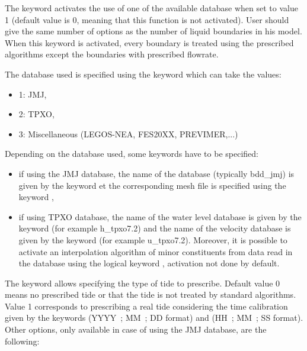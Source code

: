  The keyword  activates the use of one of the available database when set to value 1 (default value is 0, meaning that this function is not activated). User should give the same number of options as the number of liquid boundaries in his model. When this keyword is activated, every boundary is treated using the prescribed algorithms except the boundaries with prescribed flowrate.

 The database used is specified using the keyword which can take the values:

\begin{itemize}
\item [\nonumber] 1: JMJ,

\item [\nonumber] 2: TPXO,

\item [\nonumber] 3: Miscellaneous (LEGOS-NEA, FES20XX, PREVIMER,...)
\end{itemize}

  Depending on the database used, some keywords have to be specified:

\begin{itemize}
\item  if using the JMJ database, the name of the database (typically bdd\_jmj) is given by the keyword  et the corresponding mesh file is specified using the keyword ,

\item  if using TPXO database, the name of the water level database is given by the keyword  (for example h\_tpxo7.2) and the name of the velocity database is given by the keyword  (for example u\_tpxo7.2). Moreover, it is possible to activate an interpolation algorithm of minor constituents from data read in the database using the logical keyword , activation not done by default.
\end{itemize}

 The keyword allows specifying the type of tide to prescribe. Default value 0 means no prescribed tide or that the tide is not treated by standard algorithms. Value 1 corresponds to prescribing a real tide considering the time calibration given by the keywords  (YYYY~; MM~; DD format) and  (HH~; MM~; SS format). Other options, only available in case of using the JMJ database, are the following:

